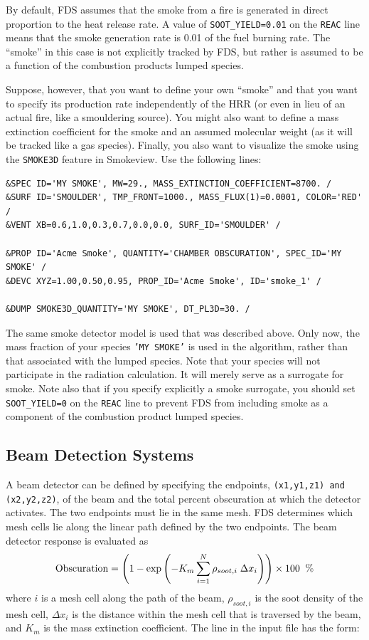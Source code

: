 \documentclass[11pt]{book}
\newcommand{\ct}{\tt\small}
\newcommand{\be}{\begin{equation}}
\newcommand{\ee}{\end{equation}}
\begin{document}
By default, FDS assumes that the smoke from a fire is generated in direct proportion to the heat release rate. A value
of {\ct SOOT\_YIELD=0.01} on the {\ct REAC} line means that the smoke generation rate is 0.01 of the fuel burning rate. The
``smoke'' in this case is not explicitly tracked by FDS, but rather is assumed to be a function of the combustion products lumped species.

Suppose, however, that you want to define your own ``smoke'' and that you want to specify its production rate independently of
the HRR (or even in lieu of an actual fire, like a smouldering source). You might also want to define a mass extinction coefficient for the
smoke and an assumed molecular weight (as it will be tracked like a gas species). Finally, you also want to visualize the smoke using
the {\ct SMOKE3D} feature in Smokeview. Use the following lines:

\footnotesize
\begin{verbatim}
&SPEC ID='MY SMOKE', MW=29., MASS_EXTINCTION_COEFFICIENT=8700. /
&SURF ID='SMOULDER', TMP_FRONT=1000., MASS_FLUX(1)=0.0001, COLOR='RED' /
&VENT XB=0.6,1.0,0.3,0.7,0.0,0.0, SURF_ID='SMOULDER' /

&PROP ID='Acme Smoke', QUANTITY='CHAMBER OBSCURATION', SPEC_ID='MY SMOKE' /
&DEVC XYZ=1.00,0.50,0.95, PROP_ID='Acme Smoke', ID='smoke_1' /

&DUMP SMOKE3D_QUANTITY='MY SMOKE', DT_PL3D=30. /
\end{verbatim}

\normalsize
\noindent
The same smoke detector model is used that was described above. Only now, the mass fraction of your species {\ct 'MY SMOKE'} is used in the
algorithm, rather than that associated with the lumped species. Note that your species will not participate in the radiation calculation. It
will merely serve as a surrogate for smoke. Note also that if you specify explicitly a smoke surrogate, you should set {\ct SOOT\_YIELD=0} on the
{\ct REAC} line to prevent FDS from including smoke as a component of the combustion product lumped species.



\subsection{Beam Detection Systems}
\label{info:beam_detector}

A beam detector can be defined by specifying the endpoints, {\ct (x1,y1,z1) and (x2,y2,z2)}, of the beam and the
total percent obscuration at which the detector activates.  The two endpoints must lie in the same mesh.  FDS determines which mesh
cells lie along the linear path defined by the two endpoints.  The beam detector response is evaluated as
\be
  \hbox{Obscuration}  = \left(1 - \exp \left( -K_m \sum_{i=1}^N {\rho_{soot,i}\; \Delta x_i} \right)  \right) \times 100  \; \; \hbox{\%}
\ee
where $i$ is a mesh cell along the path of the beam, $\rho_{soot,i}$ is the soot density of the mesh cell, $ \Delta x_i$
is the distance within the mesh cell that is traversed by the beam, and $K_m$ is the mass extinction coefficient. The line in the input file has the form:
\end{document}
